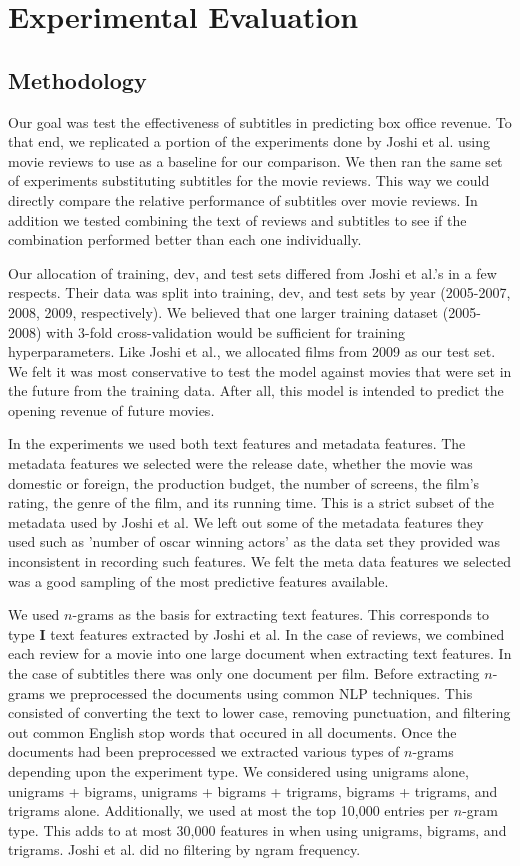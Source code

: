 \documentclass[11pt]{article}
\begin{document}
\section{Experimental Evaluation}
\subsection{Methodology}
Our goal was test the effectiveness of subtitles in predicting box office revenue.
To that end, we replicated a portion of the experiments done by Joshi et al. using
movie reviews to use as a baseline for our comparison. We then ran the same set of
experiments substituting subtitles for the movie reviews. This way we could directly
compare the relative performance of subtitles over movie reviews. In addition we
tested combining the text of reviews and subtitles to see if the combination performed
better than each one individually.

Our allocation of training, dev, and test sets differed from Joshi et al.'s in a few
respects. Their data was split into training, dev, and test sets by year
(2005-2007, 2008, 2009, respectively). We believed that one larger training dataset
(2005-2008) with 3-fold cross-validation would be sufficient for training hyperparameters.
Like Joshi et al., we allocated films from 2009 as our test set.
We felt it was most conservative to test the model against movies that were
set in the future from the training data. After all, this model is intended to predict
the opening revenue of future movies. 

In the experiments we used both text features and metadata features. The metadata features
we selected were the release date, whether the movie was domestic or foreign, the production
budget, the number of screens, the film's rating, the genre of the film, and its running
time. This is a strict subset of the metadata used by Joshi et al. We left out some of the
metadata features they used such as 'number of oscar winning actors' as the data set they
provided was inconsistent in recording such features. We felt the meta data features we
selected was a good sampling of the most predictive features available.

We used $n$-grams as the basis for extracting text features. This corresponds to type
\textbf{I} text features extracted by Joshi et al. In the case of reviews, we combined
each review for a movie into one large document when extracting text features. In the
case of subtitles there was only one document per film. Before extracting $n$-grams we
preprocessed the documents using common NLP techniques. This consisted of converting
the text to lower case, removing punctuation, and filtering out common English stop words that occured in all documents. Once the documents had been preprocessed we extracted various types of $n$-grams depending upon the experiment type. We considered using unigrams alone,
unigrams + bigrams, unigrams + bigrams + trigrams, bigrams + trigrams, and trigrams alone.
Additionally, we used at most the top 10,000 entries per $n$-gram type. This adds to at most
30,000 features in when using unigrams, bigrams, and trigrams. Joshi et al. did no filtering
by ngram frequency.
\end{document}
